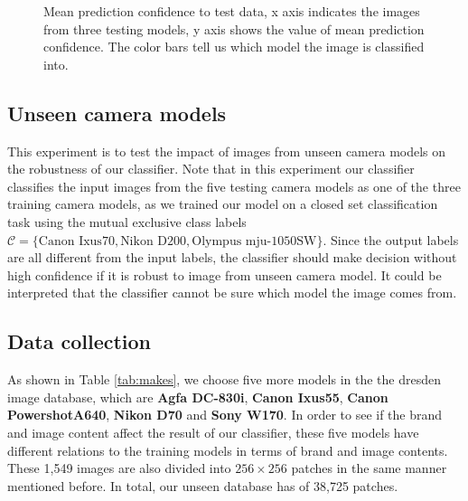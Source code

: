 \documentclass[a4paper, 9pt, twocolumn]{extarticle}
\begin{document}
\begin{figure}
	\centering
	\resizebox{!}{!}{
		{}
	}
	\caption{Mean prediction confidence to test data, x axis indicates the images from three testing models, y axis shows the value of mean prediction confidence. The color bars tell us which model the image is classified into.}
	\label{fig:test confidence}
\end{figure}

\subsection{Unseen camera models}
\label{section:unseen}

This experiment is to test the impact of images from unseen camera models on the robustness of our classifier. Note that in this experiment our classifier classifies the input images from the five testing camera models as one of the three training camera models, as we trained our model on a closed set classification task using the mutual exclusive class labels $\mathcal{C} = \{\text{Canon Ixus70}, \text{Nikon D200}, \text{Olympus mju-1050SW}\}$. Since the output labels are all different from the input labels, the classifier should make decision without high confidence if it is robust to image from unseen camera model. It could be interpreted that the classifier cannot be sure which model the image comes from.

\subsection*{Data collection}
\label{section:unseen data collection & Training}

As shown in Table \ref{tab:makes}, we choose five more models in the the dresden image database, which are \textbf{Agfa DC-830i}, \textbf{Canon Ixus55}, \textbf{Canon PowershotA640}, \textbf{Nikon D70} and \textbf{Sony W170}. In order to see if the brand and image content affect the result of our classifier, these five models have different relations to the training models in terms of brand and image contents. These 1,549 images are also divided into $ 256 \times 256 $ patches in the same manner mentioned before. In total, our unseen database has of 38,725 patches.
\end{document}
